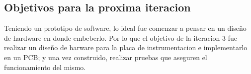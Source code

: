 \subsection{Objetivos para la proxima iteracion} %
\label{sub:objetivos_para_la_proxima_iteracion}

Teniendo un prototipo de software, lo ideal fue comenzar a pensar en un diseño de hardware en donde embeberlo. Por lo que el objetivo de la iteracion 3 fue realizar un diseño de harware para la placa de instrumentacion e implementarlo en un PCB; y una vez construido, realizar pruebas que aseguren el funcionamiento del mismo.

